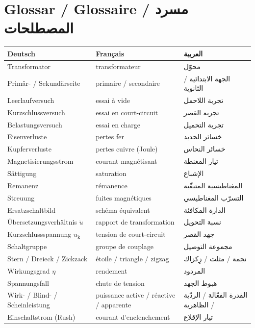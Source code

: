 \documentclass[a4paper,11pt]{article}
\newcommand{\ue}{\ddot{u}}
\begin{document}
\newpage
\section*{Glossar / Glossaire / \textarabic{مسرد المصطلحات}}
\begin{center}
\renewcommand{\arraystretch}{1.35}
\begin{tabular}{@{}lll@{}}
\toprule
\textbf{Deutsch} & \textbf{Français} & \textbf{\textarabic{العربية}}\\
\midrule
Transformator & transformateur & \textarabic{محوّل}\\
Primär- / Sekundärseite & primaire / secondaire & \textarabic{الجهة الابتدائية / الثانوية}\\
Leerlaufversuch & essai à vide & \textarabic{تجربة اللاحمل}\\
Kurzschlussversuch & essai en court-circuit & \textarabic{تجربة القصر}\\
Belastungsversuch & essai en charge & \textarabic{تجربة التحميل}\\
Eisenverluste & pertes fer & \textarabic{خسائر الحديد}\\
Kupferverluste & pertes cuivre (Joule) & \textarabic{خسائر النحاس}\\
Magnetisierungsstrom & courant magnétisant & \textarabic{تيار المغنطة}\\
Sättigung & saturation & \textarabic{الإشباع}\\
Remanenz & rémanence & \textarabic{المغناطيسية المتبقّية}\\
Streuung & fuites magnétiques & \textarabic{التسرّب المغناطيسي}\\
Ersatzschaltbild & schéma équivalent & \textarabic{الدارة المكافئة}\\
Übersetzungsverhältnis $\ue$ & rapport de transformation & \textarabic{نسبة التحويل}\\
Kurzschlussspannung $u_\mathrm{k}$ & tension de court-circuit & \textarabic{جهد القصر}\\
Schaltgruppe & groupe de couplage & \textarabic{مجموعة التوصيل}\\
Stern / Dreieck / Zickzack & étoile / triangle / zigzag & \textarabic{نجمة / مثلث / زِكزاك}\\
Wirkungsgrad $\eta$ & rendement & \textarabic{المردود}\\
Spannungsfall & chute de tension & \textarabic{هبوط الجهد}\\
Wirk- / Blind- / Scheinleistung & puissance active / réactive / apparente & \textarabic{القدرة الفعّالة / الردّية / الظاهرية}\\
Einschaltstrom (Rush) & courant d'enclenchement & \textarabic{تيار الإقلاع}\\
\bottomrule
\end{tabular}
\end{center}
\end{document}
